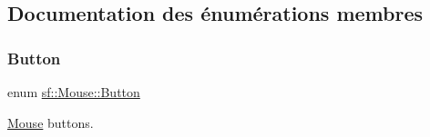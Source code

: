 \subsection{Documentation des énumérations membres}
\mbox{\label{classsf_1_1Mouse_a4fb128be433f9aafe66bc0c605daaa90}} 
\subsubsection{\texorpdfstring{Button}{Button}}
{\footnotesize\ttfamily enum \hyperlink{classsf_1_1Mouse_a4fb128be433f9aafe66bc0c605daaa90}{sf\+::\+Mouse\+::\+Button}}



\hyperlink{classsf_1_1Mouse}{Mouse} buttons. 

